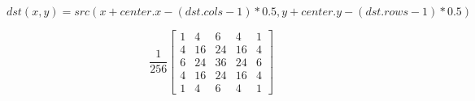 \documentclass{article}
\begin{document}
\[ dst(x, y) = src(x + center.x - (dst.cols - 1) * 0.5, y + center.y - (dst.rows - 1) * 0.5) \]
\pagebreak

\[ \frac{1}{256} \begin{bmatrix} 1 & 4 & 6 & 4 & 1 \\ 4 & 16 & 24 & 16 & 4 \\ 6 & 24 & 36 & 24 & 6 \\ 4 & 16 & 24 & 16 & 4 \\ 1 & 4 & 6 & 4 & 1 \end{bmatrix} \]
\pagebreak
\end{document}

